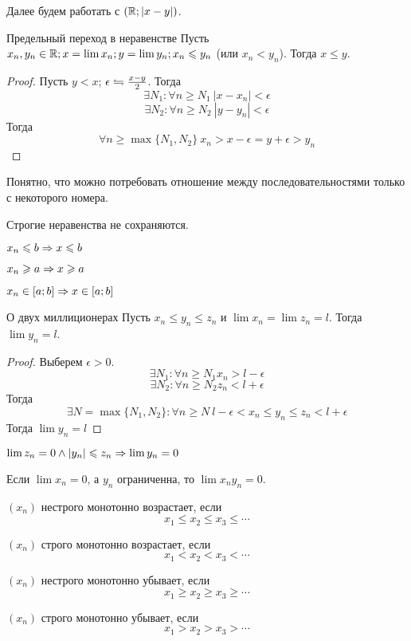 Далее будем работать с $(\mathbb{R}; |x - y|)$.

\begin{theorem}{Предельный переход в неравенстве}
Пусть $x_n, y_n \in \mathbb{R}; x = \lim x_n; y = \lim y_n; x_n \leqslant y_n$ (или $x_n < y_n$). Тогда $x \leqslant y$.
\end{theorem}
\begin{proof}
Пусть $y < x$; $\epsilon \leftrightharpoons \frac{x - y}2$. Тогда 
$$\exists N_1: \forall n \geqslant N_1\: |x - x_n| < \epsilon$$
$$\exists N_2: \forall n \geqslant N_2\: |y - y_n| < \epsilon$$
Тогда
$$\forall n \geqslant \max\{N_1, N_2\}\: x_n > x - \epsilon = y + \epsilon > y_n$$
\end{proof}
\begin{Rem}
Понятно, что можно потребовать отношение между последовательностями только с некоторого номера.
\end{Rem}                                                 
\begin{Rem}
Строгие неравенства не сохраняются.
\end{Rem}
\begin{conseq}
$x_n \leqslant b \Rightarrow x \leqslant b$
\end{conseq}
\begin{conseq}
$x_n \geqslant a \Rightarrow x \geqslant a$
\end{conseq}
\begin{conseq}
$x_n \in [a;b] \Rightarrow x \in [a; b]$
\end{conseq}

\begin{theorem}{О двух миллиционерах}
Пусть $x_n \leqslant y_n \leqslant z_n$ и $\lim x_n = \lim z_n = l$. Тогда $\lim y_n = l$.
\end{theorem}
\begin{proof}
Выберем $\epsilon > 0$.
$$\exists N_1\colon\forall n \geqslant N_1 x_n > l - \epsilon$$
$$\exists N_2\colon\forall n \geqslant N_2 z_n < l + \epsilon$$
Тогда
$$\exists N = \max\{N_1,N_2\}\colon\forall n \geqslant N\:l - \epsilon < x_n \leqslant y_n \leqslant z_n < l + \epsilon$$
Тогда $\lim y_n = l$
\end{proof}
\begin{conseq}
$\lim z_n = 0 \land |y_n| \leqslant z_n \Rightarrow \lim y_n = 0$
\end{conseq}
\begin{conseq}
Если $\lim x_n = 0$, а $y_n$ ограниченна, то $\lim x_ny_n = 0$.
\end{conseq}

\begin{Def}
$(x_n)$ нестрого монотонно возрастает, если $$x_1 \leqslant x_2 \leqslant x_3 \leqslant \cdots$$

$(x_n)$ строго монотонно возрастает, если $$x_1 < x_2 < x_3 < \cdots$$

$(x_n)$ нестрого монотонно убывает, если $$x_1 \geqslant x_2 \geqslant x_3 \geqslant \cdots$$

$(x_n)$ строго монотонно убывает, если $$x_1 > x_2 > x_3 > \cdots$$
\end{Def}

